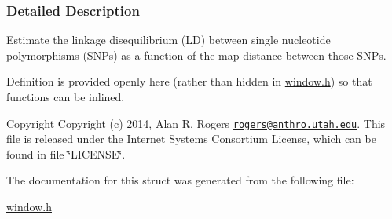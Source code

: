 \subsubsection{Detailed Description}
Estimate the linkage disequilibrium (L\+D) between single nucleotide polymorphisms (S\+N\+Ps) as a function of the map distance between those S\+N\+Ps. 

Definition is provided openly here (rather than hidden in \hyperlink{window_8h}{window.\+h}) so that functions can be inlined.

\begin{DoxyCopyright}{Copyright}
Copyright (c) 2014, Alan R. Rogers \href{mailto:rogers@anthro.utah.edu}{\tt rogers@anthro.\+utah.\+edu}. This file is released under the Internet Systems Consortium License, which can be found in file \char`\"{}\+L\+I\+C\+E\+N\+S\+E\char`\"{}. 
\end{DoxyCopyright}


The documentation for this struct was generated from the following file\+:\begin{DoxyCompactItemize}
\item 
\hyperlink{window_8h}{window.\+h}\end{DoxyCompactItemize}
